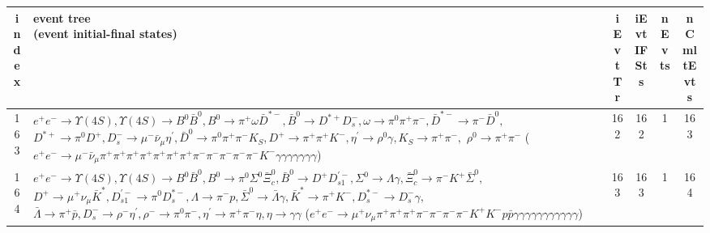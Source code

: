 \documentclass[landscape]{article}
\begin{document}
\clearpage

\begin{table}[htbp!]
\small
\centering
\begin{tabular}{|c|>{\centering}p{18cm}|c|c|c|c|}
\hline
index & \thead{event tree \\ (event initial-final states)} & iEvtTr & iEvtIFSts & nEvts & nCmltEvts \\
\hline
163 & \makecell{ $ 
e^{+} e^{-} \rightarrow \Upsilon(4S) ,
\Upsilon(4S) \rightarrow B^{0} \bar{B}^{0} ,
B^{0} \rightarrow \pi^{+} \omega \bar{D}^{*-} ,
\bar{B}^{0} \rightarrow D^{*+} D_{s}^{-} ,
\omega \rightarrow \pi^{0} \pi^{+} \pi^{-} ,
\bar{D}^{*-} \rightarrow \pi^{-} \bar{D}^{0} ,
$ \\ $
D^{*+} \rightarrow \pi^{0} D^{+} ,
D_{s}^{-} \rightarrow \mu^{-} \bar{\nu}_{\mu} \eta^{\prime} ,
\bar{D}^{0} \rightarrow \pi^{0} \pi^{+} \pi^{-} K_{S} ,
D^{+} \rightarrow \pi^{+} \pi^{+} K^{-} ,
\eta^{\prime} \rightarrow \rho^{0} \gamma ,
K_{S} \rightarrow \pi^{+} \pi^{-} ,
$ \\ $
\rho^{0} \rightarrow \pi^{+} \pi^{-} 
$ \\ ($
e^{+} e^{-} \rightarrow \mu^{-} \bar{\nu}_{\mu} \pi^{+} \pi^{+} \pi^{+} \pi^{+} \pi^{+} \pi^{+} \pi^{+} \pi^{-} \pi^{-} \pi^{-} \pi^{-} \pi^{-} K^{-} \gamma \gamma \gamma \gamma \gamma \gamma \gamma 
$) } & 162 & 162 & 1 & 163 \\
\hline
164 & \makecell{ $ 
e^{+} e^{-} \rightarrow \Upsilon(4S) ,
\Upsilon(4S) \rightarrow B^{0} \bar{B}^{0} ,
B^{0} \rightarrow \pi^{0} \Sigma^{0} \bar{\Xi}_{c}^{0} ,
\bar{B}^{0} \rightarrow D^{+} D_{s1}^{\prime-} ,
\Sigma^{0} \rightarrow \Lambda \gamma ,
\bar{\Xi}_{c}^{0} \rightarrow \pi^{-} K^{+} \bar{\Sigma}^{0} ,
$ \\ $
D^{+} \rightarrow \mu^{+} \nu_{\mu} \bar{K}^{*} ,
D_{s1}^{\prime-} \rightarrow \pi^{0} D_{s}^{*-} ,
\Lambda \rightarrow \pi^{-} p ,
\bar{\Sigma}^{0} \rightarrow \bar{\Lambda} \gamma ,
\bar{K}^{*} \rightarrow \pi^{+} K^{-} ,
D_{s}^{*-} \rightarrow D_{s}^{-} \gamma ,
$ \\ $
\bar{\Lambda} \rightarrow \pi^{+} \bar{p} ,
D_{s}^{-} \rightarrow \rho^{-} \eta^{\prime} ,
\rho^{-} \rightarrow \pi^{0} \pi^{-} ,
\eta^{\prime} \rightarrow \pi^{+} \pi^{-} \eta ,
\eta \rightarrow \gamma \gamma 
$ \\ ($
e^{+} e^{-} \rightarrow \mu^{+} \nu_{\mu} \pi^{+} \pi^{+} \pi^{+} \pi^{-} \pi^{-} \pi^{-} \pi^{-} K^{+} K^{-} p \bar{p} \gamma \gamma \gamma \gamma \gamma \gamma \gamma \gamma \gamma \gamma \gamma 
$) } & 163 & 163 & 1 & 164 \\

\end{tabular}
\end{table}
\end{document}
